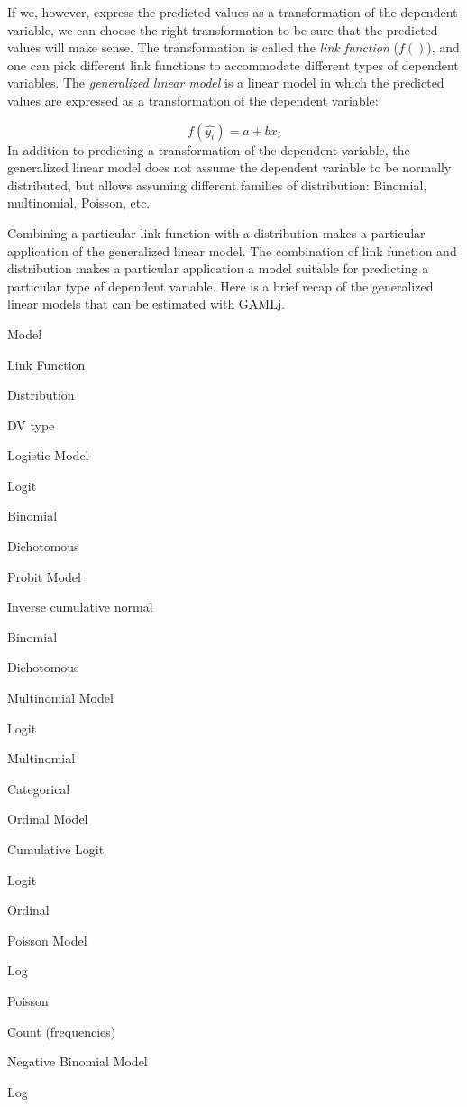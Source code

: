 \documentclass[
]{book}
\begin{document}
If we, however, express the predicted values as a transformation of the dependent variable, we can choose the right transformation to be sure that the predicted values will make sense. The transformation is called the \emph{link function} (\(f()\)), and one can pick different link functions to accommodate different types of dependent variables. The \emph{generalized linear model} is a linear model in which the predicted values are expressed as a transformation of the dependent variable:

\[
f(\hat{y_i})=a+b x_i
\]
In addition to predicting a transformation of the dependent variable, the generalized linear model does not assume the dependent variable to be normally distributed, but allows assuming different families of distribution: Binomial, multinomial, Poisson, etc.

Combining a particular link function with a distribution makes a particular application of the generalized linear model. The combination of link function and distribution makes a particular application a model suitable for predicting a particular type of dependent variable. Here is a brief recap of the generalized linear models that can be estimated with {GAMLj}.

Model

Link Function

Distribution

DV type

Logistic Model

Logit

Binomial

Dichotomous

Probit Model

Inverse cumulative normal

Binomial

Dichotomous

Multinomial Model

Logit

Multinomial

Categorical

Ordinal Model

Cumulative Logit

Logit

Ordinal

Poisson Model

Log

Poisson

Count (frequencies)

Negative Binomial Model

Log
\end{document}
